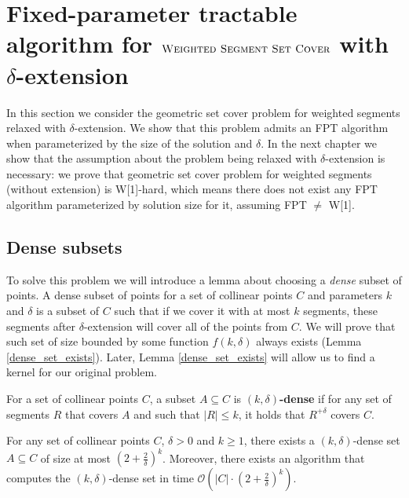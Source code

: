 \section{Fixed-parameter tractable algorithm for $\textsc{Weighted Segment Set Cover}$ with $\delta$-extension}
\label{section:fpt_weighted}

In this section we consider the geometric set cover problem
for weighted segments relaxed with $\delta$-extension.
We show that this problem
admits an FPT algorithm when parameterized by the size
of the solution and $\delta$.
In the next chapter we show that the assumption
about the problem being relaxed with $\delta$-extension is necessary:
we prove that geometric set cover problem
for weighted segments (without extension) is W[1]-hard, which means
there does not exist any FPT algorithm parameterized by solution size for it,
assuming FPT $\neq$ W[1].

\fptWeightedSegment*

\subsection{Dense subsets}

To solve this problem we will introduce a lemma about choosing
a \textit{dense} subset of points. A dense subset of points
for a set of collinear points $C$ and parameters $k$ and $\delta$
is a subset of $C$ such that
if we cover it with at most $k$ segments,
these segments after $\delta$-extension will cover all of the points from $C$.
We will prove that such set 
of size bounded by some function $f(k, \delta)$
always exists (Lemma \ref{dense_set_exists}).
Later, Lemma \ref{dense_set_exists} will allow us to find a kernel
for our original problem.

\begin{defi}
	For a set of collinear points $C$,
	a subset $A \subseteq C$ is \textbf{$(k,\delta)$-dense} 
	if for any set of segments $R$ that covers $A$ and
	such that $|R| \le k$, it holds that $R^{+\delta}$ covers $C$.
\end{defi}

\begin{lemma}
	\label{dense_set_exists}
	For any set of collinear points $C$, $\delta > 0$ and $k \ge 1$,
	there exists a $(k,\delta)$-dense set $A \subseteq C$ of size
	at most $(2+\frac{2}{\delta})^k$.
	Moreover, there exists an algorithm that computes the $(k,\delta)$-dense set
	in time $\mathcal{O}(|C| \cdot (2+\frac{2}{\delta})^k)$.
\end{lemma}

